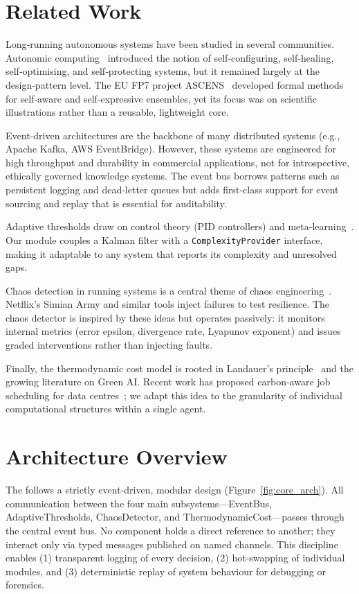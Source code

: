 \section{Related Work}

Long‑running autonomous systems have been studied in several communities.
Autonomic computing~\cite{kephart2003autonomic} introduced the notion of
self‑configuring, self‑healing, self‑optimising, and self‑protecting
systems, but it remained largely at the design‑pattern level.  The EU
FP7 project ASCENS~\cite{wirsing2012ascens} developed formal methods for
self‑aware and self‑expressive ensembles, yet its focus was on scientific
illustrations rather than a reusable, lightweight core.

Event‑driven architectures are the backbone of many distributed systems
(e.g., Apache Kafka, AWS EventBridge).  However, these systems are
engineered for high throughput and durability in commercial applications,
not for introspective, ethically governed knowledge systems.  The \Core{}
event bus borrows patterns such as persistent logging and dead‑letter
queues but adds first‑class support for event sourcing and replay that
is essential for auditability.

Adaptive thresholds draw on control theory (PID controllers) and
meta-learning~\cite{finn2017maml}.  Our module couples a Kalman filter
with a \texttt{ComplexityProvider} interface, making it adaptable to
any system that reports its complexity and unresolved gaps.

Chaos detection in running systems is a central theme of chaos
engineering~\cite{basiri2016chaos}.  Netflix's Simian Army and similar
tools inject failures to test resilience.  The \Core{} chaos detector is
inspired by these ideas but operates passively: it monitors internal
metrics (error epsilon, divergence rate, Lyapunov exponent) and issues
graded interventions rather than injecting faults.

Finally, the thermodynamic cost model is rooted in Landauer's
principle~\cite{landauer1961} and the growing literature on Green AI.
Recent work has proposed carbon‑aware job scheduling for data
centres~\cite{acun2023carbon}; we adapt this idea to the granularity of
individual computational structures within a single agent.

\section{Architecture Overview}

The \Core{} follows a strictly event-driven, modular design (Figure~\ref{fig:core_arch}).  
All communication between the four main subsystems---EventBus, AdaptiveThresholds,
ChaosDetector, and ThermodynamicCost---passes through the central event bus.  
No component holds a direct reference to another; they interact only via typed
messages published on named channels.  This discipline enables (1) transparent
logging of every decision, (2) hot-swapping of individual modules, and
(3) deterministic replay of system behaviour for debugging or forensics.

